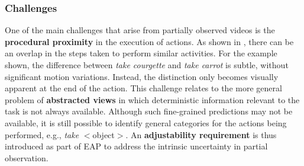 \subsubsection{Challenges}
\label{sec:prediction::EAP:::challenges}

One of the main challenges that arise from partially observed videos is the \textbf{procedural proximity} in the execution of actions. As shown in , there can be an overlap in the steps taken to perform similar activities. For the example shown, the difference between \textit{take courgette} and \textit{take carrot} is subtle, without significant motion variations. Instead, the distinction only becomes visually apparent at the end of the action. This challenge relates to the more general problem of \textbf{abstracted views} in which deterministic information relevant to the task is not always available. Although such fine-grained predictions may not be available, it is still possible to identify general categories for the actions being performed, e.g., \textit{take} $<$object$>$. An \textbf{adjustability requirement} is thus introduced as part of EAP to address the intrinsic uncertainty in partial observation.


